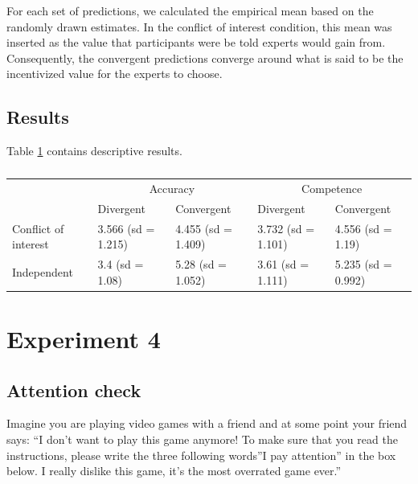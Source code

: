 \documentclass[
  doc,floatsintext]{apa6}
\begin{document}
For each set of predictions, we calculated the empirical mean based on the randomly drawn estimates. In the conflict of interest condition, this mean was inserted as the value that participants were be told experts would gain from. Consequently, the convergent predictions converge around what is said to be the incentivized value for the experts to choose.

\subsection{Results}\label{results-2}

Table \ref{tab:exp3-table} contains descriptive results.

\begin{table}

\caption{\label{tab:exp3-table}}
\centering
\begin{tabular}[t]{lllll}
\toprule
\multicolumn{1}{c}{} & \multicolumn{2}{c}{Accuracy} & \multicolumn{2}{c}{Competence} \\
\cmidrule(l{3pt}r{3pt}){2-3} \cmidrule(l{3pt}r{3pt}){4-5}
  & Divergent & Convergent & Divergent & Convergent\\
\midrule
Conflict of interest & 3.566 (sd = 1.215) & 4.455 (sd = 1.409) & 3.732 (sd = 1.101) & 4.556 (sd = 1.19)\\
Independent & 3.4 (sd = 1.08) & 5.28 (sd = 1.052) & 3.61 (sd = 1.111) & 5.235 (sd = 0.992)\\
\bottomrule
\end{tabular}
\end{table}

\clearpage

\section{Experiment 4}\label{exp4}

\FloatBarrier

\subsection{Attention check}\label{attention-check-3}

Imagine you are playing video games with a friend and at some point your friend says: ``I don't want to play this game anymore! To make sure that you read the instructions, please write the three following words''I pay attention'' in the box below. I really dislike this game, it's the most overrated game ever.''
\end{document}
